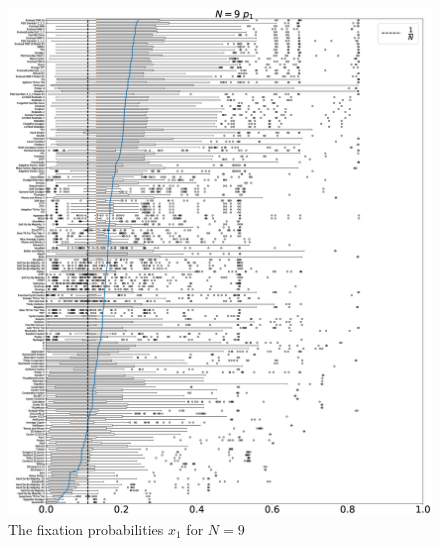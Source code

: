 \documentclass[10pt,letterpaper]{article}
\begin{document}
\begin{figure}[!hbtp]
    \centering
    \includegraphics[draft, width=\textwidth]{./Fig19.eps}
    \caption{The fixation probabilities \(x_1\) for \(N=9\)}
\end{figure}
\end{document}
